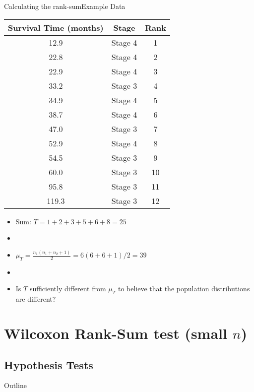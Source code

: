 \documentclass[xcolor=dvipsnames]{beamer}
\begin{document}
\begin{frame}{Calculating the rank-sum}{Example Data}
\begin{center}{\tiny
	\begin{tabular}{|c|c|c|}
		\hline
		\textbf{Survival Time (months)} &  \textbf{Stage} & \textbf{Rank}\\ \hline \hline
		12.9 &Stage 4 & 1 \\ \hline
		22.8 &Stage 4 & 2\\ \hline
		22.9& Stage 4 & 3\\ \hline
		33.2 &Stage 3 & 4\\ \hline
		34.9& Stage 4 & 5\\ \hline
		38.7 &Stage 4 & 6\\ \hline
		47.0 &Stage 3 & 7\\ \hline		
		52.9  &Stage 4 & 8\\ \hline
		54.5 &Stage 3 & 9\\ \hline				
		60.0 &Stage 3 & 10\\ \hline
		95.8& Stage 3 & 11\\ \hline
		119.3 &Stage 3 & 12\\ \hline
	\end{tabular}}
\end{center}
\begin{itemize}
	\item Sum: $T = 1 + 2 + 3 + 5 + 6 + 8 = 25$
	\item[]
	\item $\mu_T = \frac{n_1 (n_1 + n_2 + 1)}{2} = 6(6+6+1)/2 = 39$
	\item[]
	\item Is $T$ sufficiently different from $\mu_T$ to believe that the population distributions are different?
\end{itemize}
\end{frame}

\section{Wilcoxon Rank-Sum test (small $n$)}

\subsection{Hypothesis Tests}
\begin{frame}{Outline}
\tableofcontents[currentsection,subsectionstyle=show/shaded/hide]
\end{frame}
\end{document}
